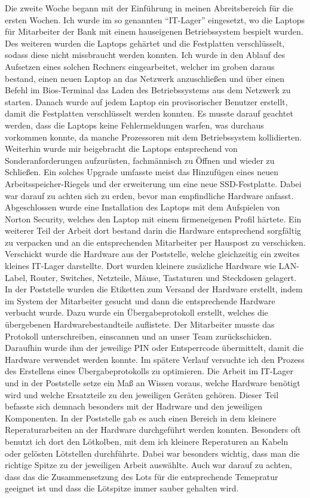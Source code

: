 Die zweite Woche begann mit der Einführung in meinen Abreitsbereich für die ersten Wochen. Ich wurde im so genannten “IT-Lager” eingesetzt, wo die Laptops für Mitarbeiter der Bank mit einem hauseigenen Betriebssystem bespielt wurden. Des weiteren wurden die Laptops gehärtet und die Festplatten verschlüsselt, sodass diese nicht missbraucht werden konnten. Ich wurde in den Ablauf des Aufsetzen eines solchen Rechners eingearbeitet, welcher im groben daraus bestand, einen neuen Laptop an das Netzwerk anzuschließen und über einen Befehl im Bios-Terminal das Laden des Betriebssystems aus dem Netzwerk zu starten. Danach wurde auf jedem Laptop ein provisorischer Benutzer erstellt, damit die Festplatten verschlüsselt werden konnten. Es musste darauf geachtet werden, dass die Laptops keine Fehlermeldungen warfen, was durchaus vorkommen konnte, da manche Prozessoren mit dem Betriebssystem kollidierten. Weiterhin wurde mir beigebracht die Laptops entsprechend von Sonderanforderungen aufzurüsten, fachmännisch zu Öffnen und wieder zu Schließen. Ein solches Upgrade umfasste meist das Hinzufügen eines neuen Arbeitsspeicher-Riegels und der erweiterung um eine neue SSD-Festplatte. Dabei war darauf zu achten sich zu erden, bevor man empfindliche Hardware anfasst. Abgeschlossen wurde eine Installation des Laptops mit dem Aufspielen von Norton Security, welches den Laptop mit einem firmeneigenen Profil härtete. Ein weiterer Teil der Arbeit dort bestand darin die Hardware entsprechend sorgfältig zu verpacken und an die entsprechenden Mitarbeiter per Hauspost zu verschicken. Verschickt wurde die Hardware aus der Poststelle, welche gleichzeitig ein zweites kleines IT-Lager darstellte. Dort wurden kleinere zusäzliche Hardware wie LAN-Label, Router, Switches, Netzteile, Mäuse, Tastaturen und Steckdosen gelagert. In der Poststelle wurden die Etiketten zum Versand der Hardware erstellt, indem im System der Mitarbeiter gesucht und dann die entsprechende Hardware verbucht wurde. Dazu wurde ein Übergabeprotokoll erstellt, welches die übergebenen Hardwarebestandteile auflistete. Der Mitarbeiter musste das Protokoll unterschreiben, einscannen und an unser Team zurückschicken. Daraufhin wurde ihm der jeweilige PIN oder Entsperrcode übermittelt, damit die Hardware verwendet werden konnte. Im spätere Verlauf versuchte ich den Prozess des Erstellens eines Übergabeprotokolls zu optimieren. Die Arbeit im IT-Lager und in der Poststelle setze ein Maß an Wissen voraus, welche Hardware benötigt wird und welche Ersatzteile zu den jeweiligen Geräten gehören. Dieser Teil befasste sich demnach besonders mit der Hadrware und den jeweiligen Komponenten. In der Poststelle gab es auch einen Bereich in dem kleinere Reperaturarbeiten an der Hardware durchgeführt werden konnten. Besonders oft benutzt ich dort den Lötkolben, mit dem ich kleinere Reperaturen an Kabeln oder gelösten Lötstellen durchführte. Dabei war besonders wichtig, dass man die richtige Spitze zu der jeweiligen Arbeit auswählte. Auch war darauf zu achten, dass das die Zusammensetzung des Lots für die entsprechende Temepratur geeignet ist und dass die Lötspitze immer sauber gehalten wird.
